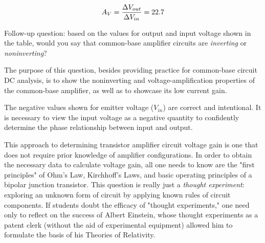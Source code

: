 $$A_V = {\Delta V_{out} \over \Delta V_{in}} = 22.7$$

\vskip 10pt

Follow-up question: based on the values for output and input voltage shown in the table, would you say that common-base amplifier circuits are {\it inverting} or {\it noninverting}?







The purpose of this question, besides providing practice for common-base circuit DC analysis, is to show the noninverting and voltage-amplification properties of the common-base amplifier, as well as to showcase its low current gain.

The negative values shown for emitter voltage ($V_{in}$) are correct and intentional.  It is necessary to view the input voltage as a negative quantity to confidently determine the phase relationship between input and output.

This approach to determining transistor amplifier circuit voltage gain is one that does not require prior knowledge of amplifier configurations.  In order to obtain the necessary data to calculate voltage gain, all one needs to know are the "first principles" of Ohm's Law, Kirchhoff's Laws, and basic operating principles of a bipolar junction transistor.  This question is really just a {\it thought experiment}: exploring an unknown form of circuit by applying known rules of circuit components.  If students doubt the efficacy of "thought experiments," one need only to reflect on the success of Albert Einstein, whose thought experiments as a patent clerk (without the aid of experimental equipment) allowed him to formulate the basis of his Theories of Relativity.




